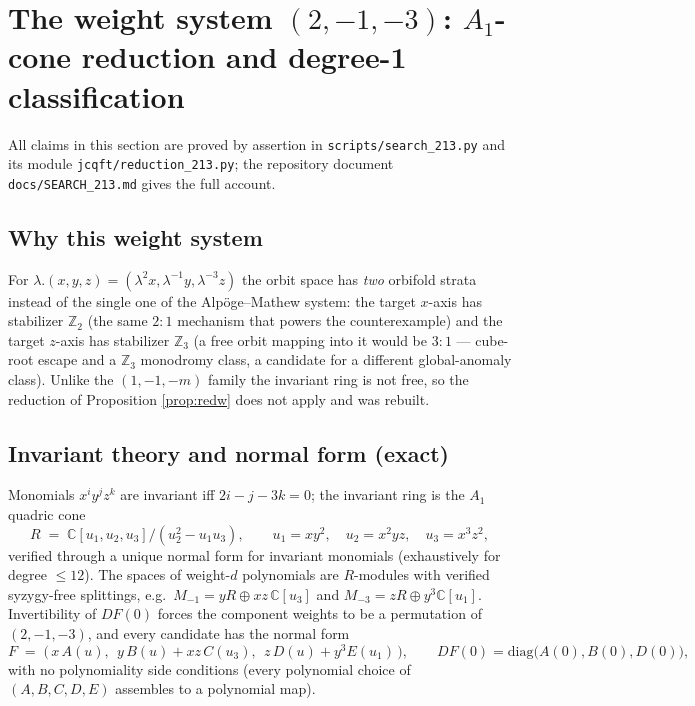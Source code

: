 \documentclass[11pt]{article}
\theoremstyle{definition}
\theoremstyle{remark}
\newcommand{\C}{\mathbb{C}}
\newcommand{\Z}{\mathbb{Z}}
\begin{document}
\section{The weight system \texorpdfstring{$(2,-1,-3)$}{(2,-1,-3)}:
\texorpdfstring{$A_1$}{A1}-cone reduction and degree-1
classification}\label{sec:213}

All claims in this section are proved by assertion in
\texttt{scripts/search\_213.py} and its module
\texttt{jcqft/reduction\_213.py}; the repository document
\texttt{docs/SEARCH\_213.md} gives the full account.

\subsection{Why this weight system}

For $\lambda.(x,y,z) = (\lambda^2x, \lambda^{-1}y, \lambda^{-3}z)$ the
orbit space has \emph{two} orbifold strata instead of the single one of
the Alp\"oge--Mathew system: the target $x$-axis has stabilizer $\Z_2$
(the same $2{:}1$ mechanism that powers the counterexample) and the
target $z$-axis has stabilizer $\Z_3$ (a free orbit mapping into it
would be $3{:}1$ --- cube-root escape and a $\Z_3$ monodromy class, a
candidate for a different global-anomaly class). Unlike the
$(1,-1,-m)$ family the invariant ring is not free, so the reduction of
Proposition \ref{prop:redw} does not apply and was rebuilt.

\subsection{Invariant theory and normal form (exact)}

Monomials $x^iy^jz^k$ are invariant iff $2i - j - 3k = 0$; the invariant
ring is the $A_1$ quadric cone
\[
R \;=\; \C[u_1,u_2,u_3]/(u_2^2 - u_1u_3),
\qquad
u_1 = xy^2,\quad u_2 = x^2yz,\quad u_3 = x^3z^2,
\]
verified through a unique normal form for invariant monomials
(exhaustively for degree $\le 12$). The spaces of weight-$d$
polynomials are $R$-modules with verified syzygy-free splittings, e.g.\
$M_{-1} = yR \oplus xz\,\C[u_3]$ and $M_{-3} = zR \oplus y^3\C[u_1]$.
Invertibility of $DF(0)$ forces the component weights to be a
permutation of $(2,-1,-3)$, and every candidate has the normal form
\[
F \;=\; \bigl(\,x\,A(u),\ \ y\,B(u) + xz\,C(u_3),\ \
 z\,D(u) + y^3E(u_1)\,\bigr),
\qquad
DF(0) = \mathrm{diag}\bigl(A(0), B(0), D(0)\bigr),
\]
with no polynomiality side conditions (every polynomial choice of
$(A,B,C,D,E)$ assembles to a polynomial map).
\end{document}
